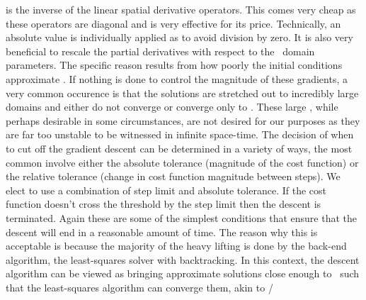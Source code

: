 \begin{itemize}
{is the inverse of the linear spatial derivative operators. This comes very cheap
as these operators are diagonal and is very effective for its price. Technically,
an absolute value is individually applied as to avoid division by zero. It is
also very beneficial to rescale the partial derivatives with respect to the
\spt\ domain parameters. The specific reason results from how poorly the
initial conditions approximate \twots. If nothing is done to control the
magnitude of these gradients, a very common occurence is that the solutions
are stretched out to incredibly large domains and either do not converge
or converge only to \eqva. These large \eqva, while perhaps desirable in
some circumstances, are not desired for our purposes as they are far
too unstable to be witnessed in infinite space-time.
The decision of when to cut off the gradient descent can
be determined in a variety of ways, the most common involve either the
absolute tolerance (magnitude of the cost function) or the relative tolerance
(change in cost function magnitude between steps).
We elect to use a combination of step limit and absolute tolerance. If the
cost function doesn't cross the threshold by the step limit then the descent is terminated.
Again these are some of the simplest conditions that ensure that the descent
will end in a reasonable amount of time.
The reason why this is acceptable is because the majority
of the heavy lifting is done by the back-end algorithm, the least-squares solver with backtracking.
In this context, the descent algorithm can be viewed as bringing approximate solutions
close enough to \twots\ such that the least-squares algorithm can converge them, akin
to /



}
\end{itemize}
